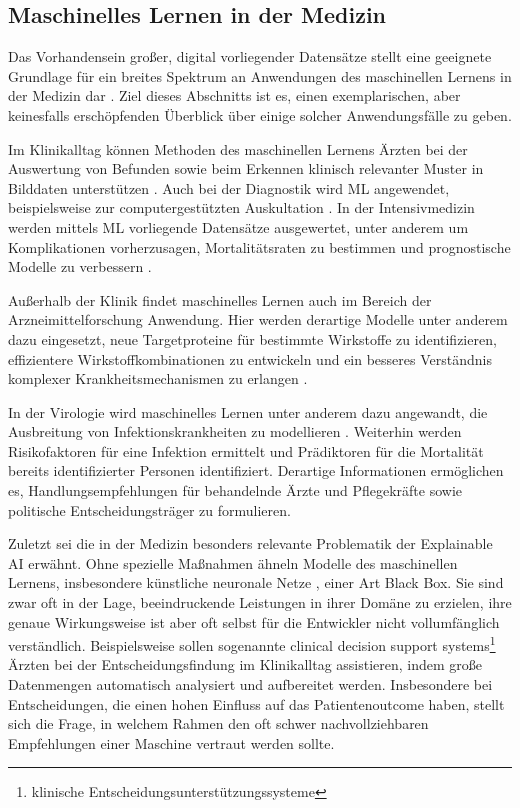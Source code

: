\subsection{Maschinelles Lernen in der Medizin}
Das Vorhandensein großer, digital vorliegender Datensätze stellt eine geeignete Grundlage für ein breites Spektrum an Anwendungen des maschinellen Lernens in der Medizin dar \citep{chenHowDevelopMachine2019}. Ziel dieses Abschnitts ist es, einen exemplarischen, aber keinesfalls erschöpfenden Überblick über einige solcher Anwendungsfälle zu geben.

Im Klinikalltag können Methoden des maschinellen Lernens Ärzten bei der Auswertung von Befunden sowie beim Erkennen klinisch relevanter Muster in Bilddaten unterstützen \citep{shahArtificialIntelligenceMachine2019}. Auch bei der Diagnostik wird ML angewendet, beispielsweise zur computergestützten Auskultation \citep{reedHeartSoundAnalysis2004}. In der Intensivmedizin werden mittels ML vorliegende Datensätze ausgewertet, unter anderem um Komplikationen vorherzusagen, Mortalitätsraten zu bestimmen und prognostische Modelle zu verbessern \citep{shillanUseMachineLearning2019, krishnanSupervisedLearningApproach2018}.

Außerhalb der Klinik findet maschinelles Lernen auch im Bereich der Arzneimittelforschung Anwendung. Hier werden derartige Modelle unter anderem dazu eingesetzt, neue Targetproteine für bestimmte Wirkstoffe zu identifizieren, effizientere Wirkstoffkombinationen zu entwickeln und ein besseres Verständnis komplexer Krankheitsmechanismen zu erlangen \citep{vamathevanApplicationsMachineLearning2019}.

In der Virologie wird maschinelles Lernen unter anderem dazu angewandt, die Ausbreitung von Infektionskrankheiten zu modellieren \citep{9121027}. Weiterhin werden Risikofaktoren für eine Infektion ermittelt und Prädiktoren für die Mortalität bereits identifizierter Personen identifiziert. Derartige Informationen ermöglichen es, Handlungsempfehlungen für behandelnde Ärzte und Pflegekräfte \citep{colubriMachineLearningPrognosticModels2019} sowie politische Entscheidungsträger \citep{satuMachineLearningBasedApproaches2020} zu formulieren.

Zuletzt sei die in der Medizin besonders relevante Problematik der Explainable AI erwähnt. Ohne spezielle Maßnahmen ähneln Modelle des maschinellen Lernens, insbesondere künstliche neuronale Netze , einer Art Black Box. Sie sind zwar oft in der Lage, beeindruckende Leistungen in ihrer Domäne zu erzielen, ihre genaue Wirkungsweise ist aber oft selbst für die Entwickler nicht vollumfänglich verständlich. Beispielsweise sollen sogenannte clinical decision support systems\footnote{klinische Entscheidungsunterstützungssysteme} Ärzten bei der Entscheidungsfindung im Klinikalltag assistieren, indem große Datenmengen automatisch analysiert und aufbereitet werden. Insbesondere bei Entscheidungen, die einen hohen Einfluss auf das Patientenoutcome haben, stellt sich die Frage, in welchem Rahmen den oft schwer nachvollziehbaren Empfehlungen einer Maschine vertraut werden sollte.